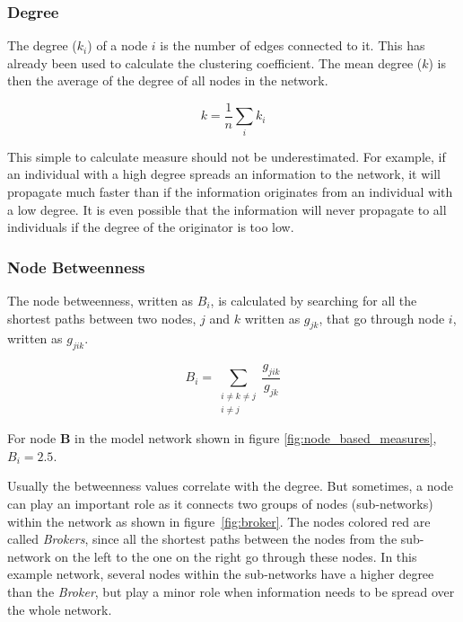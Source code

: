 \subsubsection{Degree}

The degree ($k_i$) of a node $i$ is the number of edges connected to it. This has already been used to calculate the clustering coefficient. The mean degree ($k$) is then the average of the degree of all nodes in the network.

\begin{equation}
k = \frac{1}{n}\sum_i k_i
\end{equation}

This simple to calculate measure should not be underestimated. For example, if an individual with a high degree spreads an information to the network, it will propagate much faster than if the information originates from an individual with a low degree. It is even possible that the information will never propagate to all individuals if the degree of the originator is too low.

\subsubsection{Node Betweenness}
\label{subsubsec:node_between}

The node betweenness, written as $B_i$, is calculated by searching for all the shortest paths between two nodes, $j$ and $k$ written as $g_{jk}$, that go through node $i$, written as $g_{jik}$.

\begin{equation}
B_i =	\sum_{
			\substack{i \neq k \neq j \\ i \neq j}
		}
		\frac{g_{jik}}{g_{jk}}
\end{equation}

For node \textbf{B} in the model network shown in figure \ref{fig:node_based_measures}, $B_i = 2.5$.

Usually the betweenness values correlate with the degree. But sometimes, a node can play an important role as it connects two groups of nodes (sub-networks) within the network as shown in figure~\ref{fig:broker}. The nodes colored red are called \textit{Brokers}\citep{lusseau:04}, since all the shortest paths between the nodes from the sub-network on the left to the one on the right go through these nodes. In this example network, several nodes within the sub-networks have a higher degree than the \textit{Broker}, but play a minor role when information needs to be spread over the whole network.   

